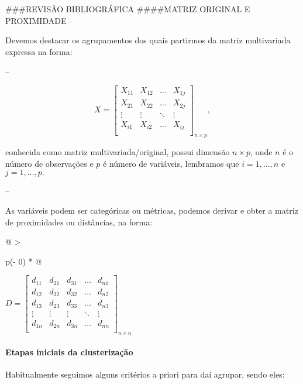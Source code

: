 \documentclass[
]{article}
\begin{document}
\#\#\#REVISÃO BIBLIOGRÁFICA \#\#\#\#MATRIZ ORIGINAL E PROXIMIDADE --

Devemos destacar os agrupamentos dos quais partirmos da matriz
multivariada expressa na forma:

--

\[X = \begin{bmatrix}
X_{11} & X_{12} & \ldots & X_{1j} \\
X_{21} & X_{22} & \ldots & X_{2j} \\
\vdots & \vdots & \ddots & \vdots \\
X_{i1} & X_{i2} & \ldots & X_{ij} \\
\end{bmatrix}_{n \times p},\]

conhecida como matriz multivariada/original, possui dimensão
\({n \times p}\), onde \(n\) é o número de observações e \(p\) é número
de variáveis, lembramos que \(i = 1, \ldots , n\) e
\(j = 1 , \ldots , p.\)

--

As variáveis podem ser categóricas ou métricas, podemos derivar e obter
a matriz de proximidades ou distâncias, na forma:

\begin{longtable}[]{@{}
  >{\raggedright\arraybackslash}p{}@{}}
\toprule\noalign{}
\endhead
\bottomrule\noalign{}
\endlastfoot
\(D = \begin{bmatrix}
d_{11} & d_{21} & d_{31} & \ldots & d_{n1} \\
d_{12} & d_{22} &  d_{32} & \ldots & d_{n2} \\
d_{13} & d_{23} & d_{33}  & \ldots  & d_{n3} \\
\vdots & \vdots & \vdots  & \ddots & \vdots \\
d_{1n}& d_{2n} & d_{3n} &\ldots &  d_{nn}\\
\end{bmatrix}_{n \times n}\) \\
\end{longtable}

\hypertarget{etapas-iniciais-da-clusterizauxe7uxe3o}{%
\paragraph{Etapas iniciais da
clusterização}\label{etapas-iniciais-da-clusterizauxe7uxe3o}}

Habitualmente seguimos alguns critérios a priori para daí agrupar, sendo
eles:
\end{document}
